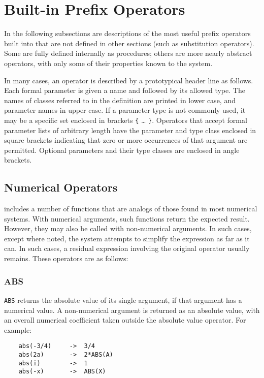 \chapter{Built-in Prefix Operators}
In the following subsections are descriptions of the most useful prefix
operators built into {\REDUCE} that are not defined in other sections (such
as substitution operators). Some are fully defined internally as
procedures; others are more nearly abstract operators, with only some of
their properties known to the system.

In many cases, an operator is described by a prototypical header line as
follows. Each formal parameter is given a name and followed by its allowed
type. The names of classes referred to in the definition are printed in
lower case, and parameter names in upper case. If a parameter type is not
commonly used, it may be a specific set enclosed in brackets {\tt \{} \ldots
{\tt \}}.
Operators that accept formal parameter lists of arbitrary length have the
parameter and type class enclosed in square brackets indicating that zero
or more occurrences of that argument are permitted. Optional parameters
and their type classes are enclosed in angle brackets.

\section{Numerical Operators}
{\REDUCE} includes a number of functions that are analogs of those found
in most numerical systems.  With numerical arguments, such functions
return the expected result.  However, they may also be called with
non-numerical arguments.  In such cases, except where noted, the system
attempts to simplify the expression as far as it can.  In such cases, a
residual expression involving the original operator usually remains.
These operators are as follows:

\subsection{ABS}
\hypertarget{operator:ABS}{}
{\tt ABS} returns the absolute value
of its single argument, if that argument has a numerical value.
A non-numerical argument is returned as an absolute value, with an overall
numerical coefficient taken outside the absolute value operator. For example:
\begin{verbatim}
	abs(-3/4)     ->  3/4
	abs(2a)       ->  2*ABS(A)
	abs(i)        ->  1
	abs(-x)       ->  ABS(X)
\end{verbatim}

